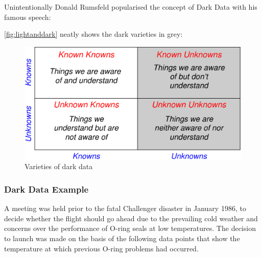 Unintentionally Donald Rumsfeld popularised the concept of Dark Data with his famous speech:

\begin{quote}
\end{quote}

\autoref{fig:lightanddark} neatly shows the dark varieties in grey:

\begin{figure}[htbp]
  \centering
  \includegraphics[width=\textwidth/2]{images/darkknowns.pdf}
  \caption{Varieties of dark data}
  \label{fig:lightanddark}
\end{figure}

\subsubsection{Dark Data Example}
A meeting was held prior to the fatal Challenger disaster in January 1986, to decide whether the flight should go ahead due to the prevailing cold weather and concerns over the performance of O-ring seals at low temperatures. The decision to launch was made on the basis of the following data points that show the temperature at which previous O-ring problems had occurred.

